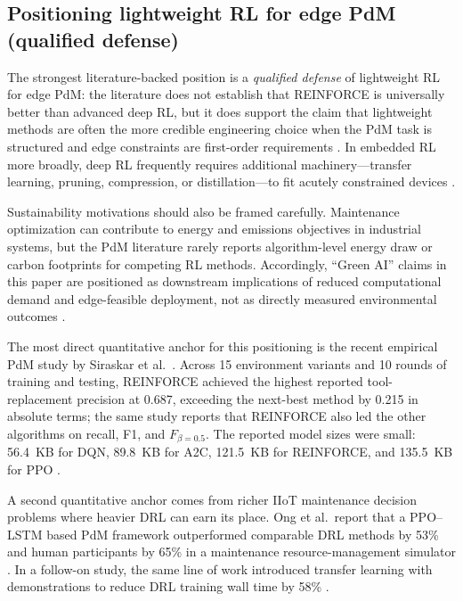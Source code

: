 \documentclass[refree,sn-basic]{sn-jnl} %
\begin{document}
\subsection{Positioning lightweight RL for edge PdM (qualified defense)}
The strongest literature-backed position is a \emph{qualified defense} of lightweight RL for edge PdM: the literature does not establish that REINFORCE is universally better than advanced deep RL, but it does support the claim that lightweight methods are often the more credible engineering choice when the PdM task is structured and edge constraints are first-order requirements \cite{Compare2020, Njor2024, Pandey2023}. In embedded RL more broadly, deep RL frequently requires additional machinery---transfer learning, pruning, compression, or distillation---to fit acutely constrained devices \cite{Jang2020, Szydlo2022, Xu2022}.

Sustainability motivations should also be framed carefully. Maintenance optimization can contribute to energy and emissions objectives in industrial systems, but the PdM literature rarely reports algorithm-level energy draw or carbon footprints for competing RL methods. Accordingly, ``Green AI'' claims in this paper are positioned as downstream implications of reduced computational demand and edge-feasible deployment, not as directly measured environmental outcomes \cite{Banyai2021, Banyai2022, JasiulewiczKaczmarek2024}.

The most direct quantitative anchor for this positioning is the recent empirical PdM study by Siraskar et al.~\cite{Siraskar2025}. Across 15 environment variants and 10 rounds of training and testing, REINFORCE achieved the highest reported tool-replacement precision at 0.687, exceeding the next-best method by 0.215 in absolute terms; the same study reports that REINFORCE also led the other algorithms on recall, F1, and $F_{\beta=0.5}$. The reported model sizes were small: 56.4~KB for DQN, 89.8~KB for A2C, 121.5~KB for REINFORCE, and 135.5~KB for PPO \cite{Siraskar2025}.

A second quantitative anchor comes from richer IIoT maintenance decision problems where heavier DRL can earn its place. Ong et al.~report that a PPO--LSTM based PdM framework outperformed comparable DRL methods by 53\% and human participants by 65\% in a maintenance resource-management simulator \cite{Ong2022-01}. In a follow-on study, the same line of work introduced transfer learning with demonstrations to reduce DRL training wall time by 58\% \cite{Ong2022-02}.
\end{document}
